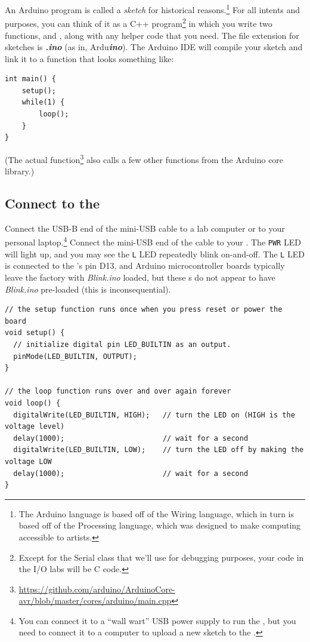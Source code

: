 An Arduino program is called a \textit{sketch} for historical
reasons.\footnote{The Arduino language is based off of the Wiring language,
which in turn is based off of the Processing language, which was designed to
make computing accessible to artists.} For all intents and purposes, you can
think of it as a C++ program\footnote{Except for the Serial class that we'll
use for debugging purposes, your code in the I/O labs will be C code.} in which
you write two functions,  and , along with
any helper code that you need. The file extension for sketches is
\textbf{\textit{.ino}} (as in, Ardu\textbf{\textit{ino}}). The Arduino IDE will
compile your sketch and link it to a  function that looks
something like:
\begin{lstlisting}
int main() {
    setup();
    while(1) {
        loop();
    }
}
\end{lstlisting}
(The actual  function\footnote{\url{https://github.com/arduino/ArduinoCore-avr/blob/master/cores/arduino/main.cpp}}
also calls a few other functions from the Arduino core library.)

\subsection{Connect to the \nano}

Connect the USB-B end of the mini-USB cable to a lab computer or to your
personal laptop.\footnote{You can connect it to a ``wall wart'' USB power
supply to run the \nano, but you need to connect it to a computer to upload a
new sketch to the \nano.} Connect the mini-USB end of the cable to your \nano.
The \texttt{PWR} LED will light up, and you may see the \texttt{L} LED
repeatedly blink on-and-off. The \texttt{L} LED is connected to the \nano's pin
D13, and Arduino microcontroller boards typically leave the factory with
\textit{Blink.ino} loaded, but these \nano{}s do not appear to have
\textit{Blink.ino} pre-loaded (this is inconsequential).

\begin{lstlisting}[basicstyle=\ttfamily\footnotesize]
// the setup function runs once when you press reset or power the board
void setup() {
  // initialize digital pin LED_BUILTIN as an output.
  pinMode(LED_BUILTIN, OUTPUT);
}

// the loop function runs over and over again forever
void loop() {
  digitalWrite(LED_BUILTIN, HIGH);   // turn the LED on (HIGH is the voltage level)
  delay(1000);                       // wait for a second
  digitalWrite(LED_BUILTIN, LOW);    // turn the LED off by making the voltage LOW
  delay(1000);                       // wait for a second
}
\end{lstlisting}

